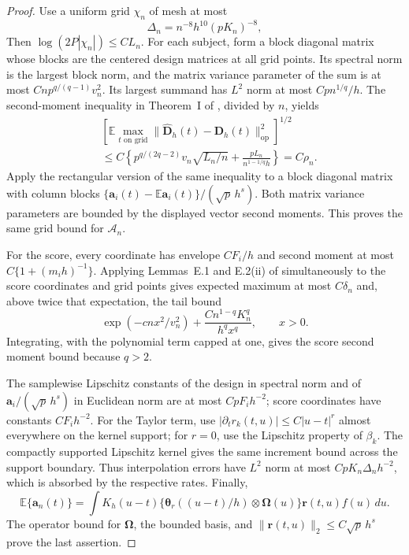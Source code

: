 \documentclass[10pt]{book}
\newcommand{\ba}{{\mathbf a}}
\newcommand{\br}{{\mathbf r}}
\newcommand{\bD}{{\mathbf D}}
\newcommand{\btheta}  {\boldsymbol{\theta}}
\newcommand{\bOmega} {\boldsymbol{\Omega}}
\newcommand{\expect}{\mathbb{E}}
\numberwithin{equation}{section}
\begin{document}
\begin{proof}
Use a uniform grid $\chi_n$ of mesh at most
\[
\Delta_n=n^{-8}h^{10}(pK_n)^{-8},
\]
Then $\log(2P|\chi_n|)\le CL_n$.
For each subject, form a block diagonal matrix whose blocks are the
centered design matrices at all grid points. Its spectral norm is
the largest block norm, and the matrix variance parameter of the sum
is at most $Cnp^{q/(q-1)}v_n^2$. Its largest summand has $L^2$ norm
at most $Cpn^{1/q}/h$.
The second-moment inequality in Theorem~I of
\citet{tropp_expected_2016}, divided by $n$, yields
\[
\begin{aligned}
&\left[\expect\max_{t\text{ on grid}}
\|\widehat{\bD}_h(t)-\bD_h(t)\|_{\mathrm{op}}^2\right]^{1/2}\\
&\le C\left\{p^{q/(2q-2)}v_n\sqrt{L_n/n}
+\frac{pL_n}{n^{1-1/q}h}\right\}=C\rho_n.
\end{aligned}
\]
Apply the rectangular version of the same inequality to a block
diagonal matrix with column blocks
$\{\ba_i(t)-\expect\ba_i(t)\}/(\sqrt p\,h^s)$.
Both matrix variance parameters are bounded by the displayed vector
second moments. This proves the same grid bound for $\mathcal A_n$.

For the score, every coordinate has envelope $CF_i/h$ and second
moment at most $C\{1+(m_i h)^{-1}\}$. Applying Lemmas~E.1 and
E.2(ii) of \citet{chernozhukov_central_2017} simultaneously to the
score coordinates and grid points gives expected maximum at most
$C\delta_n$ and, above twice that expectation, the tail bound
\[
\exp(-cnx^2/v_n^2)+
\frac{Cn^{1-q}K_n^q}{h^q x^q},\qquad x>0.
\]
Integrating, with the polynomial term capped at one, gives the score
second moment bound because $q>2$.

The samplewise Lipschitz constants of the design in spectral norm
and of $\ba_i/(\sqrt p\,h^s)$ in Euclidean norm are at most
$CpF_i h^{-2}$; score coordinates have constants $CF_i h^{-2}$.
For the Taylor term, use
$|\partial_t r_k(t,u)|\le C|u-t|^r$ almost everywhere on the kernel
support; for $r=0$, use the Lipschitz property of $\beta_k$.
The compactly supported Lipschitz kernel gives the same increment
bound across the support boundary. Thus interpolation errors have
$L^2$ norm at most $CpK_n\Delta_n h^{-2}$, which is absorbed by the
respective rates.
Finally,
\[
\expect\{\ba_n(t)\}=\int K_h(u-t)
\{\btheta_r((u-t)/h)\otimes\bOmega(u)\}\br(t,u)f(u)\,du.
\]
The operator bound for $\bOmega$, the bounded basis, and
$\|\br(t,u)\|_2\le C\sqrt p\,h^s$ prove the last assertion.
\end{proof}
\end{document}
